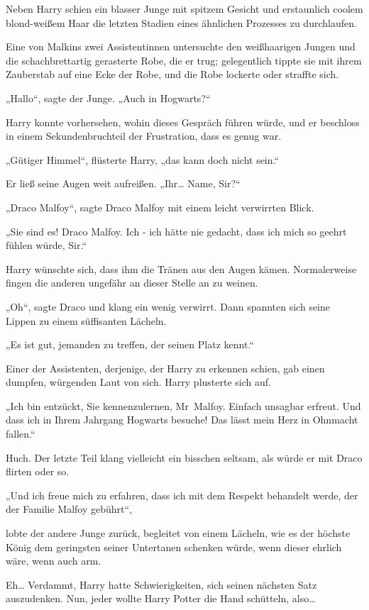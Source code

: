 {Neben Harry schien ein blasser Junge mit spitzem Gesicht und erstaunlich coolem blond-weißem Haar die letzten Stadien eines ähnlichen Prozesses zu durchlaufen.

Eine von Malkins zwei Assistentinnen untersuchte den weißhaarigen Jungen und die schachbrettartig gerasterte Robe, die er trug; gelegentlich tippte sie mit ihrem Zauberstab auf eine Ecke der Robe, und die Robe lockerte oder straffte sich.

„Hallo“, sagte der Junge. „Auch in Hogwarts?“

Harry konnte vorhersehen, wohin dieses Gespräch führen würde, und er beschloss in einem Sekundenbruchteil der Frustration, dass es genug war.

„Gütiger Himmel“, flüsterte Harry, „das kann doch nicht sein.“

Er ließ seine Augen weit aufreißen. „Ihr… Name, Sir?“

„Draco Malfoy“, sagte Draco Malfoy mit einem leicht verwirrten Blick.

„Sie sind es! Draco Malfoy. Ich - ich hätte nie gedacht, dass ich mich so geehrt fühlen würde, Sir.“

Harry wünschte sich, dass ihm die Tränen aus den Augen kämen. Normalerweise fingen die anderen ungefähr an dieser Stelle an zu weinen.

„Oh“, sagte Draco und klang ein wenig verwirrt. Dann spannten sich seine Lippen zu einem süffisanten Lächeln.

„Es ist gut, jemanden zu treffen, der seinen Platz kennt.“

Einer der Assistenten, derjenige, der Harry zu erkennen schien, gab einen dumpfen, würgenden Laut von sich. Harry plusterte sich auf.

„Ich bin entzückt, Sie kennenzulernen, Mr~Malfoy. Einfach unsagbar erfreut. Und dass ich in Ihrem Jahrgang Hogwarts besuche! Das lässt mein Herz in Ohnmacht fallen.“

Huch. Der letzte Teil klang vielleicht ein bisschen seltsam, als würde er mit Draco flirten oder so.

„Und ich freue mich zu erfahren, dass ich mit dem Respekt behandelt werde, der der Familie Malfoy gebührt“,

lobte der andere Junge zurück, begleitet von einem Lächeln, wie es der höchste König dem geringsten seiner Untertanen schenken würde, wenn dieser ehrlich wäre, wenn auch arm.

Eh… Verdammt, Harry hatte Schwierigkeiten, sich seinen nächsten Satz auszudenken. Nun, jeder wollte Harry Potter die Hand schütteln, also…

}
